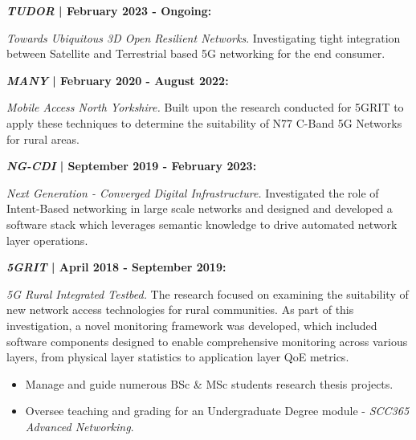 \documentclass[10pt,a4paper,ragged2e,withhyper]{altacv}
\begin{document}
\begin{paracol}{2}



\textbf{\textit{TUDOR }| February 2023 - Ongoing:} 

\textit{Towards Ubiquitous 3D Open Resilient Networks}. Investigating tight integration between Satellite and Terrestrial based 5G networking for the end consumer.

\divider

\textbf{\textit{MANY }| February 2020 - August 2022:}  

\textit{Mobile Access North Yorkshire.} Built upon the research conducted for 5GRIT to apply these techniques to determine the suitability of N77 C-Band 5G Networks for rural areas. 

\divider

\textbf{\textit{NG-CDI }| September 2019 - February 2023:} 

\textit{Next Generation - Converged Digital Infrastructure.} Investigated the role of Intent-Based networking in large scale networks and designed and developed a software stack which leverages semantic knowledge to drive automated network layer operations.

\divider

\textbf{\textit{5GRIT }| April 2018 - September 2019:} 
 
\textit{5G Rural Integrated Testbed.} The research focused on examining the suitability of new network access technologies for rural communities. As part of this investigation, a novel monitoring framework was developed, which included software components designed to enable comprehensive monitoring across various layers, from physical layer statistics to application layer QoE metrics.

\divider

\begin{itemize}
\item Manage and guide numerous BSc \& MSc students research thesis projects. 
\item Oversee teaching and grading for an Undergraduate Degree module -\textit{ SCC365 Advanced Networking}. 
\end{itemize}


\end{paracol}
\end{document}
